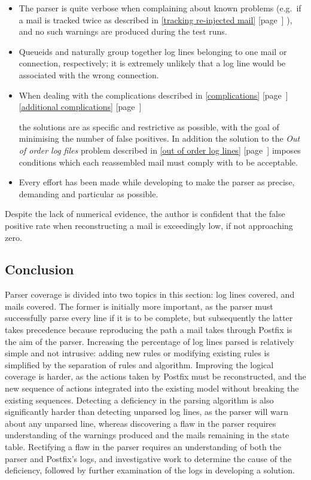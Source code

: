 \documentclass[a4paper,12pt,draft]{article}
\newcommand{\refwithpage}[1]{%
    \empty{}\ref{#1} [page~\pageref{#1}]%
}
\newcommand{\sectionref}[1]{%
    \textsection{}\refwithpage{#1}%
}
\begin{document}
\begin{itemize}

    \item The parser is quite verbose when complaining about known problems
        (e.g.\ if a mail is tracked twice as described in
        \sectionref{tracking re-injected mail}), and no such warnings are
        produced during the test runs.

    \item Queueids and \pids{} naturally group together log lines belonging
        to one mail or connection, respectively; it is extremely unlikely
        that a log line would be associated with the wrong connection.

    \item When dealing with the complications described in
        \sectionref{complications} \sectionref{additional complications}
        the solutions are as specific and restrictive as possible, with the
        goal of minimising the number of false positives.  In addition the
        solution to the \textit{Out of order log files\/} problem described
        in \sectionref{out of order log lines} imposes conditions which
        each reassembled mail must comply with to be acceptable.

    \item Every effort has been made while developing to make the parser as
        precise, demanding and particular as possible.

\end{itemize}

Despite the lack of numerical evidence, the author is confident that the
false positive rate when reconstructing a mail is exceedingly low, if not
approaching zero.

\subsection{Conclusion}

Parser coverage is divided into two topics in this section: log lines
covered, and mails covered.  The former is initially more important, as the
parser must successfully parse every line if it is to be complete, but
subsequently the latter takes precedence because reproducing the path a
mail takes through Postfix is the aim of the parser.  Increasing the
percentage of log lines parsed is relatively simple and not intrusive:
adding new rules or modifying existing rules is simplified by the
separation of rules and algorithm.  Improving the logical coverage is
harder, as the actions taken by Postfix must be reconstructed, and the new
sequence of actions integrated into the existing model without breaking
the existing sequences.  Detecting a deficiency in the parsing algorithm is
also significantly harder than detecting unparsed log lines, as the parser
will warn about any unparsed line, whereas discovering a flaw in the
parser requires understanding of the warnings produced and the mails
remaining in the state table.  Rectifying a flaw in the parser requires an
understanding of both the parser and Postfix's logs, and investigative work
to determine the cause of the deficiency, followed by further examination
of the logs in developing a solution.
\end{document}
